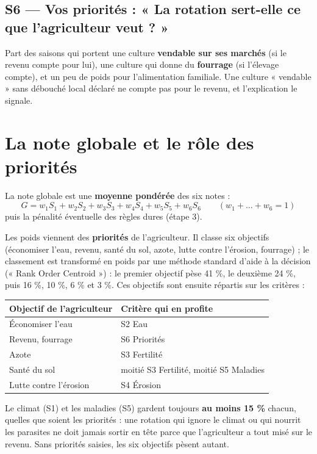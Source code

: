 \documentclass[11pt,a4paper]{article}
\begin{document}
\subsection*{S6 — Vos priorités : « La rotation sert-elle ce que l'agriculteur veut ? »}
Part des saisons qui portent une culture \textbf{vendable sur ses marchés} (si le revenu compte pour lui), une
culture qui donne du \textbf{fourrage} (si l'élevage compte), et un peu de poids pour l'alimentation familiale.
Une culture « vendable » sans débouché local déclaré ne compte pas pour le revenu, et l'explication le signale.

\section{La note globale et le rôle des priorités}\label{sec:note}

La note globale est une \textbf{moyenne pondérée} des six notes :
\[
G = w_1 S_1 + w_2 S_2 + w_3 S_3 + w_4 S_4 + w_5 S_5 + w_6 S_6 \qquad (w_1 + \dots + w_6 = 1)
\]
puis la pénalité éventuelle des règles dures (étape 3).

Les poids viennent des \textbf{priorités} de l'agriculteur. Il classe six objectifs (économiser l'eau, revenu,
santé du sol, azote, lutte contre l'érosion, fourrage) ; le classement est transformé en poids par une méthode
standard d'aide à la décision (« Rank Order Centroid ») : le premier objectif pèse 41 \%, le deuxième 24 \%, puis
16 \%, 10 \%, 6 \% et 3 \%. Ces objectifs sont ensuite répartis sur les critères :

\begin{center}
\begin{tabular}{ll}
\toprule
\textbf{Objectif de l'agriculteur} & \textbf{Critère qui en profite} \\
\midrule
Économiser l'eau & S2 Eau \\
Revenu, fourrage & S6 Priorités \\
Azote & S3 Fertilité \\
Santé du sol & moitié S3 Fertilité, moitié S5 Maladies \\
Lutte contre l'érosion & S4 Érosion \\
\bottomrule
\end{tabular}
\end{center}

\begin{attention}
Le climat (S1) et les maladies (S5) gardent toujours \textbf{au moins 15 \%} chacun, quelles que soient les
priorités : une rotation qui ignore le climat ou qui nourrit les parasites ne doit jamais sortir en tête parce que
l'agriculteur a tout misé sur le revenu. Sans priorités saisies, les six objectifs pèsent autant.
\end{attention}
\end{document}

